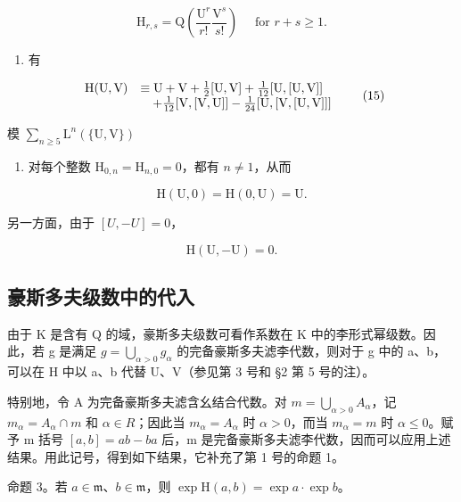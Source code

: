 \[
\mathrm{H} _ {r, s} = \mathrm{Q} \left(\frac {\mathrm{U} ^ {r}}{r !} \frac {\mathrm{V} ^ {s}}{s !}\right) \quad \text { for } r + s \geqslant 1.\tag{14}
\]

\begin{enumerate}
\def\labelenumi{(\arabic{enumi})}
\setcounter{enumi}{1}
\tightlist
\item
  有
\end{enumerate}

\[
\begin{array}{r l} \mathrm{H(U,V)} & \equiv \mathrm{U+V} + \frac {1}{2} [ \mathrm{U,V} ] + \frac {1}{12} [ \mathrm{U,[U,V]} ] \\ & \quad + \frac {1}{12} [ \mathrm{V,[V,U]} ] - \frac {1}{24} [ \mathrm{U,[V,[U,V]} ] ] \end{array} \tag {15}
\]

模 \(\sum_{n\geqslant 5}\mathrm{L}^n (\{\mathrm{U},\mathrm{V}\})\)

\begin{enumerate}
\def\labelenumi{(\arabic{enumi})}
\setcounter{enumi}{2}
\tightlist
\item
  对每个整数 \(\mathrm{H}_{0,n} = \mathrm{H}_{n,0} = 0\)，都有 \(n\neq 1\)，从而
\end{enumerate}

\[
\mathrm{H} (\mathrm{U}, 0) = \mathrm{H} (0, \mathrm{U}) = \mathrm{U}.\tag{16}
\]

另一方面，由于 \([U, -U] = 0\)，

\[
\mathrm{H} (\mathrm{U}, - \mathrm{U}) = 0.\tag{17}
\]

\subsection{豪斯多夫级数中的代入}

由于 K 是含有 Q 的域，豪斯多夫级数可看作系数在 K 中的李形式幂级数。因此，若 g 是满足 \(g = \bigcup_{\alpha > 0} g_{\alpha}\) 的完备豪斯多夫滤李代数，则对于 g 中的 a、b，可以在 H 中以 a、b 代替 U、V（参见第 3 号和 §2 第 5 号的注）。

特别地，令 A 为完备豪斯多夫滤含幺结合代数。对 \(m = \bigcup_{\alpha > 0} A_{\alpha}\)，记 \(m_{\alpha} = A_{\alpha} \cap m\) 和 \(\alpha \in R\)；因此当 \(m_{\alpha} = A_{\alpha}\) 时 \(\alpha > 0\)，而当 \(m_{\alpha} = m\) 时 \(\alpha \leqslant 0\)。赋予 m 括号 \([a, b] = ab - ba\) 后，m 是完备豪斯多夫滤李代数，因而可以应用上述结果。用此记号，得到如下结果，它补充了第 1 号的命题 1。

命题 3。若 \(a \in \mathfrak{m}\)、\(b \in \mathfrak{m}\)，则 \(\exp \mathrm{H}(a, b) = \exp a \cdot \exp b\)。

